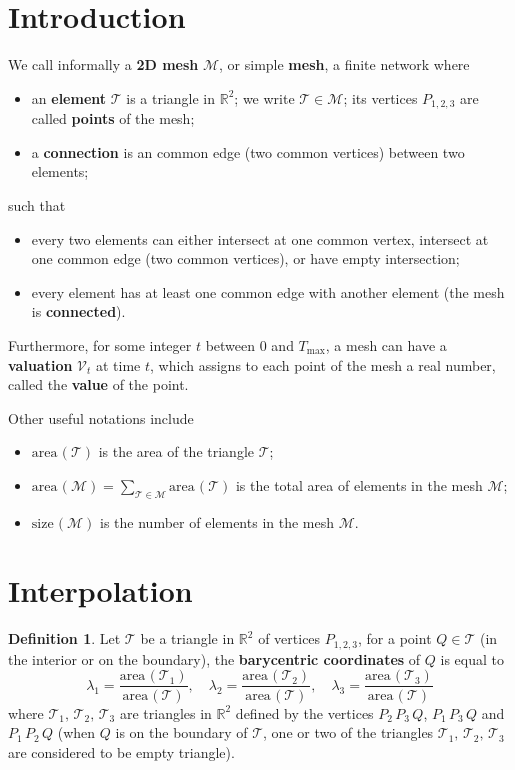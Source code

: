 \documentclass{article}
\title{}
\author{}
\date{}
\theoremstyle{definition}
\newtheorem{defn}{Definition}
\newcommand{\RR}{\mathbb{R}}
\newcommand{\MM}{\mathcal{M}}
\newcommand{\VV}{\mathcal{V}}
\newcommand{\TT}{\mathcal{T}}
\newcommand{\area}{\mathrm{area}\hspace{1pt}}
\newcommand{\size}{\mathrm{size}\hspace{1pt}}
\begin{document}
\shorthandoff{:} 

\maketitle
\small
\tableofcontents\newpage
\printindex
\normalsize

\section{Introduction}
We call informally a \textbf{2D mesh} $\MM$, or simple \textbf{mesh}, a finite network where
\begin{itemize}
\item an \textbf{element} $\TT$ is a triangle in $\RR^2$; we write $\TT\in\MM$; its vertices $P_{1,2,3}$ are called \textbf{points} of the mesh;
\item a \textbf{connection} is an common edge (two common vertices) between two elements;
\end{itemize}
such that
\begin{itemize}
\item every two elements can either intersect at one common vertex, intersect at one common edge (two common vertices), or have empty intersection;
\item every element has at least one common edge with another element (the mesh is \textbf{connected}).
\end{itemize}
Furthermore, for some integer $t$ between 0 and $T_{\max}$, 
a mesh can have a \textbf{valuation} $\VV_t$ at time $t$, which assigns to each point of the mesh a real number, called the \textbf{value} of the point.

Other useful notations include
\begin{itemize}
\item $\area(\TT)$ is the area of the triangle $\TT$; 
\item $\area(\MM)=\sum_{\TT\in\MM}\area(\TT)$ is the total area of elements in the mesh $\MM$;
\item $\size(\MM)$ is the number of elements in the mesh $\MM$.
\end{itemize}

\section{Interpolation}
\begin{defn}
Let $\TT$ be a triangle in $\RR^2$ of vertices $P_{1,2,3}$, for a point $Q\in\TT$ (in the interior or on the boundary), the \textbf{barycentric coordinates} of $Q$ is equal to
\[\lambda_1 = \frac{\area(\TT_1)}{\area(\TT)},\quad\lambda_2 = \frac{\area(\TT_2)}{\area(\TT)},\quad\lambda_3 = \frac{\area(\TT_3)}{\area(\TT)}\]
where $\TT_1,\,\TT_2,\,\TT_3$ are triangles in $\RR^2$ defined by the vertices $P_2\,P_3\,Q$, $P_1\,P_3\,Q$ and $P_1\,P_2\,Q$
(when $Q$ is on the boundary of $\TT$, one or two of the triangles $\TT_1,\,\TT_2,\,\TT_3$ are considered to be empty triangle).
\end{defn}
\end{document}

